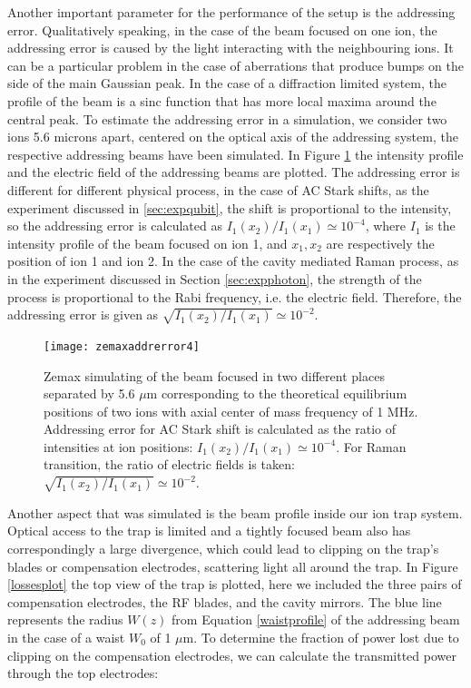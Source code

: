 Another important parameter for the performance of the setup is the addressing error. Qualitatively speaking, in the case of the beam focused on one ion, the addressing error is caused by the light interacting with the neighbouring ions. It can be a particular problem in the case of aberrations that produce bumps on the side of the main Gaussian peak. In the case of a diffraction limited system, the profile of the beam is a sinc function that has more local maxima around the central peak. To estimate the addressing error in a simulation, we consider two ions 5.6 microns apart, centered on the optical axis of the addressing system, the respective addressing beams have been simulated. In Figure \ref{zemaxaddrerror.png} the intensity profile and the electric field of the addressing beams are plotted. The addressing error is different for different physical process, in the case of AC Stark shifts, as the experiment discussed in \ref{sec:expqubit}, the shift is proportional to the intensity, so the addressing error is calculated as $I_1(x_2)/I_1(x_1) \simeq 10^{-4}$, where $I_{1}$ is the intensity profile of the beam focused on ion 1, and $x_1,x_2$ are respectively the position of ion 1 and ion 2. In the case of the cavity mediated Raman process, as in the experiment discussed in Section \ref{sec:expphoton}, the strength of the process is proportional to the Rabi frequency, i.e. the electric field. Therefore, the addressing error is given as $\sqrt{I_1(x_2)/I_1(x_1)} \simeq 10^{-2}$.\par
 \begin{figure}
 \centering
 \texttt{[image: zemaxaddrerror4]}
 \caption{Zemax simulating of the beam focused in two different places separated by 5.6 $\mu$m corresponding to the theoretical equilibrium positions of two ions with axial center of mass frequency of 1 MHz. Addressing error for AC Stark shift is calculated as the ratio of intensities at ion positions: $I_1(x_2)/I_1(x_1) \simeq 10^{-4}$. For Raman transition, the ratio of electric fields is taken: $\sqrt{I_1(x_2)/I_1(x_1)} \simeq 10^{-2}$.}
 \label{zemaxaddrerror.png}
 \end{figure}
Another aspect that was simulated is the beam profile inside our ion trap system. Optical access to the trap is limited and a tightly focused beam also has correspondingly a large divergence, which could lead to clipping on the trap's blades or compensation electrodes, scattering light all around the trap. In Figure \ref{lossesplot} the top view of the trap is plotted, here we included the three pairs of compensation electrodes, the RF blades, and the cavity mirrors. The blue line represents the radius $W(z)$ from Equation \ref{waistprofile} of the addressing beam in the case of a waist $W_0$ of 1 $\mu$m. To determine the fraction of power lost due to clipping on the compensation electrodes, we can calculate the transmitted power through the top electrodes:
